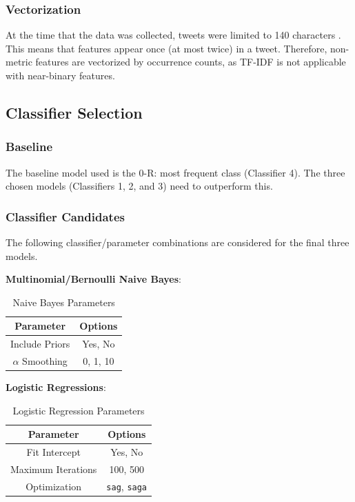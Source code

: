 \documentclass[11pt]{article}
\begin{document}
\subsubsection{Vectorization}

At the time that the data was collected, tweets were limited to 140 characters \cite{tweetlen}.
This means that features appear once (at most twice) in a tweet.
Therefore, non-metric features are vectorized by occurrence counts, 
as TF-IDF is not applicable with near-binary features. 

\subsection{Classifier Selection}

\subsubsection{Baseline}

The baseline model used is the 0-R: most frequent class (Classifier 4).
The three chosen models (Classifiers 1, 2, and 3) need to outperform this.

\subsubsection{Classifier Candidates}\label{sec:allcandidates}

The following classifier/parameter combinations are considered for the final three models. 

\textbf{Multinomial/Bernoulli Naive Bayes}:
\begin{table}[h]
	\begin{center}
		\begin{tabular}{|c|c|}			
			\hline
			Parameter & Options \\
			\hline
			Include Priors & Yes, No \\
			$\alpha$ Smoothing & 0, 1, 10 \\
			\hline
		\end{tabular}
		\caption{Naive Bayes Parameters}
		\label{tbl:nb-options}
	\end{center}
\end{table}

\textbf{Logistic Regressions}:
\begin{table}[h]
	\begin{center}
		\begin{tabular}{|c|c|}			
			\hline
			Parameter & Options \\
			\hline
			Fit Intercept & Yes, No \\
			Maximum Iterations & 100, 500 \\
			Optimization & \texttt{sag}, \texttt{saga} \\
			\hline
		\end{tabular}
		\caption{Logistic Regression Parameters}
		\label{tbl:lr-options}
	\end{center}
\end{table}
\end{document}
